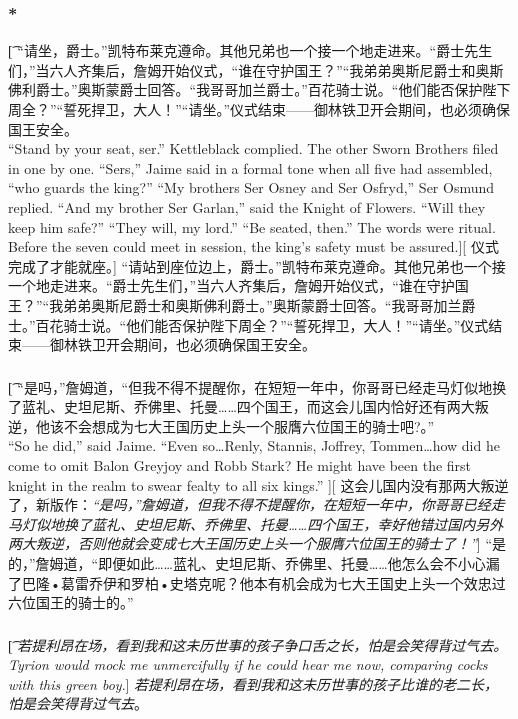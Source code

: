 \documentclass[12pt,a4paper]{article}
\begin{document}
\subsubsection{\color{red}*}\t[
	“请坐，爵士。”凯特布莱克遵命。其他兄弟也一个接一个地走进来。“爵士先生们，”当六人齐集后，詹姆开始仪式，“谁在守护国王？”“我弟弟奥斯尼爵士和奥斯佛利爵士。”奥斯蒙爵士回答。“我哥哥加兰爵士。”百花骑士说。“他们能否保护陛下周全？”“誓死捍卫，大人！”“请坐。”仪式结束——御林铁卫开会期间，也必须确保国王安全。\\
	“Stand by your seat, ser.” Kettleblack complied. The other Sworn Brothers filed in one by one. “Sers,” Jaime said in a formal tone when all five had assembled, “who guards the king?” “My brothers Ser Osney and Ser Osfryd,” Ser Osmund replied. “And my brother Ser Garlan,” said the Knight of Flowers. “Will they keep him safe?” “They will, my lord.” “Be seated, then.” The words were ritual. Before the seven could meet in session, the king's safety must be assured.][
	仪式完成了才能就座。]
	“请站到座位边上，爵士。”凯特布莱克遵命。其他兄弟也一个接一个地走进来。“爵士先生们，”当六人齐集后，詹姆开始仪式，“谁在守护国王？”“我弟弟奥斯尼爵士和奥斯佛利爵士。”奥斯蒙爵士回答。“我哥哥加兰爵士。”百花骑士说。“他们能否保护陛下周全？”“誓死捍卫，大人！”“请坐。”仪式结束——御林铁卫开会期间，也必须确保国王安全。
	
\subsubsection{}\t[
	 “是吗，”詹姆道，“但我不得不提醒你，在短短一年中，你哥哥已经走马灯似地换了蓝礼、史坦尼斯、乔佛里、托曼……四个国王，而这会儿国内恰好还有两大叛逆，他该不会想成为七大王国历史上头一个服膺六位国王的骑士吧?。” \\
	 “So he did,” said Jaime. “Even so\ldots Renly, Stannis, Joffrey, Tommen\ldots how did he come to omit Balon Greyjoy and Robb Stark? He might have been the first knight in the realm to swear fealty to all six kings.” ][
	 这会儿国内没有那两大叛逆了，新版作：\emph{“是吗，”詹姆道，但我不得不提醒你，在短短一年中，你哥哥已经走马灯似地换了蓝礼、史坦尼斯、乔佛里、托曼……四个国王，幸好他错过国内另外两大叛逆，否则他就会变成七大王国历史上头一个服膺六位国王的骑士了！”}]
	 “是的，”詹姆道，“即便如此……蓝礼、史坦尼斯、乔佛里、托曼……他怎么会不小心漏了巴隆•葛雷乔伊和罗柏•史塔克呢？他本有机会成为七大王国史上头一个效忠过六位国王的骑士的。”
	 
\subsubsection{}\t[
	\emph{若提利昂在场，看到我和这未历世事的孩子争口舌之长，怕是会笑得背过气去。\\
	Tyrion would mock me unmercifully if he could hear me now, comparing cocks with this green boy}.]
	\emph{若提利昂在场，看到我和这未历世事的孩子比谁的老二长，怕是会笑得背过气去}。
	
\end{document}
